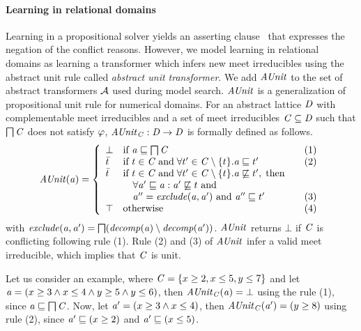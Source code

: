 \paragraph{\textbf{Learning in relational domains}}
Learning in a propositional solver yields an asserting
clause~\cite{cdcl} that expresses the negation of the conflict
reasons.  However, we model learning in relational domains as learning
a transformer which infers new meet irreducibles using the abstract
unit rule called {\em abstract unit transformer}.  We add $\mathit{AUnit}$ to
the set of abstract transformers $\mathcal{A}$ used during model
search. $\mathit{AUnit}$ is a generalization of propositional unit rule for
numerical domains.  For an abstract lattice $\mathit{D}$ with
complementable meet irreducibles and a set of meet irreducibles $\mathit{C}
\subseteq \mathit{D}$ such that $\bigsqcap
\mathit{C}$ does not satisfy $\varphi$, $\mathit{AUnit}_{\mathit{C}}: \mathit{D} \rightarrow
\mathit{D}$ is formally defined as follows.
\[ \aunit(\absval) =
 \left\{\begin{array}{l@{\quad}l@{\qquad}l}
  \bot       & \text{if } \absval \sqsubseteq \bigsqcap \conflictset & (1)\\
  \bar{t}    & \text{if } t \in \conflictset \; \text{and} \; \forall t' \in \conflictset
  \setminus \{t\}. \absval  \sqsubseteq t' & (2) \\
  \bar{t}    & \text{if } t \in \conflictset \; \text{and} \; \forall t' \in \conflictset \setminus \{t\}. \absval
  \not\sqsubseteq t', \; \text{then} \\ 
             & \quad \forall \absval' \sqsubseteq \absval: \absval'
             \not\sqsubseteq t \text{ and} \\ 
             & \quad \absval''=\exclude(\absval,\absval') \text{ and
             }\absval''\sqsubseteq t' & (3) \\
  \top & \text{otherwise} & (4) \\
 \end{array}\right.
\]
with $\mathit{exclude}(\mathit{a},\mathit{a}')=\bigsqcap({\mathit{decomp}}(\mathit{a}) \setminus
{\mathit{decomp}}(\mathit{a}'))$.  $\mathit{AUnit}$ returns $\bot$ if $\mathit{C}$ is
conflicting following rule (1).  Rule (2) and (3) of $\mathit{AUnit}$ infer a
valid meet irreducible, which implies that $\mathit{C}$ is unit.

Let us consider an example, where $\mathit{C} = \{x \geq 2, x
\leq 5, y \leq 7 \}$ and let $\mathit{a} = (x \geq 3\wedge x \leq 4\wedge
y \geq 5\wedge y \leq 6)$, then $\mathit{AUnit}_{\mathit{C}}(\mathit{a}) = \bot$
using the rule (1), since $\mathit{a} \sqsubseteq \bigsqcap\mathit{C}$.  Now,
let $\mathit{a}' = (x \geq 3\wedge x \leq 4)$, then
$\mathit{AUnit}_{\mathit{C}}(\mathit{a}') = (y \geq 8)$ using rule (2), since
$\mathit{a}' \sqsubseteq (x \geq 2)$ and $\mathit{a}' \sqsubseteq (x \leq
5)$.  

